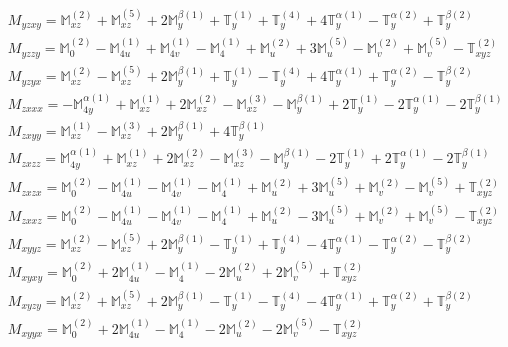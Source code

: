 \documentclass[fleqn,8pt,landscape]{jsarticle}
\begin{document}
\begin{align*}
& M_{yzxy} = \mathbb{M}_{xz}^{(2)} + \mathbb{M}_{xz}^{(5)} + 2 \mathbb{M}_{y}^{\beta(1)} + \mathbb{T}_{y}^{(1)} + \mathbb{T}_{y}^{(4)} + 4 \mathbb{T}_{y}^{\alpha(1)} - \mathbb{T}_{y}^{\alpha(2)} + \mathbb{T}_{y}^{\beta(2)} \\
& M_{yzzy} = \mathbb{M}_{0}^{(2)} - \mathbb{M}_{4u}^{(1)} + \mathbb{M}_{4v}^{(1)} - \mathbb{M}_{4}^{(1)} + \mathbb{M}_{u}^{(2)} + 3 \mathbb{M}_{u}^{(5)} - \mathbb{M}_{v}^{(2)} + \mathbb{M}_{v}^{(5)} - \mathbb{T}_{xyz}^{(2)} \\
& M_{yzyx} = \mathbb{M}_{xz}^{(2)} - \mathbb{M}_{xz}^{(5)} + 2 \mathbb{M}_{y}^{\beta(1)} + \mathbb{T}_{y}^{(1)} - \mathbb{T}_{y}^{(4)} + 4 \mathbb{T}_{y}^{\alpha(1)} + \mathbb{T}_{y}^{\alpha(2)} - \mathbb{T}_{y}^{\beta(2)} \\
& M_{zxxx} = - \mathbb{M}_{4y}^{\alpha(1)} + \mathbb{M}_{xz}^{(1)} + 2 \mathbb{M}_{xz}^{(2)} - \mathbb{M}_{xz}^{(3)} - \mathbb{M}_{y}^{\beta(1)} + 2 \mathbb{T}_{y}^{(1)} - 2 \mathbb{T}_{y}^{\alpha(1)} - 2 \mathbb{T}_{y}^{\beta(1)} \\
& M_{zxyy} = \mathbb{M}_{xz}^{(1)} - \mathbb{M}_{xz}^{(3)} + 2 \mathbb{M}_{y}^{\beta(1)} + 4 \mathbb{T}_{y}^{\beta(1)} \\
& M_{zxzz} = \mathbb{M}_{4y}^{\alpha(1)} + \mathbb{M}_{xz}^{(1)} + 2 \mathbb{M}_{xz}^{(2)} - \mathbb{M}_{xz}^{(3)} - \mathbb{M}_{y}^{\beta(1)} - 2 \mathbb{T}_{y}^{(1)} + 2 \mathbb{T}_{y}^{\alpha(1)} - 2 \mathbb{T}_{y}^{\beta(1)} \\
& M_{zxzx} = \mathbb{M}_{0}^{(2)} - \mathbb{M}_{4u}^{(1)} - \mathbb{M}_{4v}^{(1)} - \mathbb{M}_{4}^{(1)} + \mathbb{M}_{u}^{(2)} + 3 \mathbb{M}_{u}^{(5)} + \mathbb{M}_{v}^{(2)} - \mathbb{M}_{v}^{(5)} + \mathbb{T}_{xyz}^{(2)} \\
& M_{zxxz} = \mathbb{M}_{0}^{(2)} - \mathbb{M}_{4u}^{(1)} - \mathbb{M}_{4v}^{(1)} - \mathbb{M}_{4}^{(1)} + \mathbb{M}_{u}^{(2)} - 3 \mathbb{M}_{u}^{(5)} + \mathbb{M}_{v}^{(2)} + \mathbb{M}_{v}^{(5)} - \mathbb{T}_{xyz}^{(2)} \\
& M_{xyyz} = \mathbb{M}_{xz}^{(2)} - \mathbb{M}_{xz}^{(5)} + 2 \mathbb{M}_{y}^{\beta(1)} - \mathbb{T}_{y}^{(1)} + \mathbb{T}_{y}^{(4)} - 4 \mathbb{T}_{y}^{\alpha(1)} - \mathbb{T}_{y}^{\alpha(2)} - \mathbb{T}_{y}^{\beta(2)} \\
& M_{xyxy} = \mathbb{M}_{0}^{(2)} + 2 \mathbb{M}_{4u}^{(1)} - \mathbb{M}_{4}^{(1)} - 2 \mathbb{M}_{u}^{(2)} + 2 \mathbb{M}_{v}^{(5)} + \mathbb{T}_{xyz}^{(2)} \\
& M_{xyzy} = \mathbb{M}_{xz}^{(2)} + \mathbb{M}_{xz}^{(5)} + 2 \mathbb{M}_{y}^{\beta(1)} - \mathbb{T}_{y}^{(1)} - \mathbb{T}_{y}^{(4)} - 4 \mathbb{T}_{y}^{\alpha(1)} + \mathbb{T}_{y}^{\alpha(2)} + \mathbb{T}_{y}^{\beta(2)} \\
& M_{xyyx} = \mathbb{M}_{0}^{(2)} + 2 \mathbb{M}_{4u}^{(1)} - \mathbb{M}_{4}^{(1)} - 2 \mathbb{M}_{u}^{(2)} - 2 \mathbb{M}_{v}^{(5)} - \mathbb{T}_{xyz}^{(2)}
\end{align*}
\end{document}
